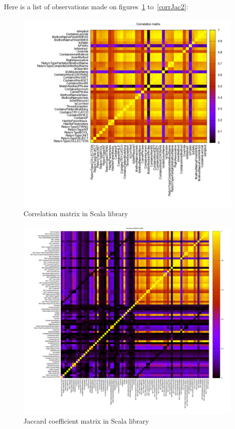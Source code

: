 \documentclass[12pt]{article}
\begin{document}
Here is a list of observations made on figures~\ref{corrCor} to~\ref{corrJac2}:
\begin{figure}[h]
\hspace*{-4cm}
\includegraphics[width=20cm]{images/corrCOR.png}
\caption{Correlation matrix in Scala library}
\label{corrCor}
\end{figure}
\begin{figure}[h]
\hspace*{-3,5cm}
\includegraphics[width=20cm]{images/corrJAC.png}
\caption{Jaccard coefficient matrix in Scala library}
\label{corrJac}
\end{figure}
\end{document}
